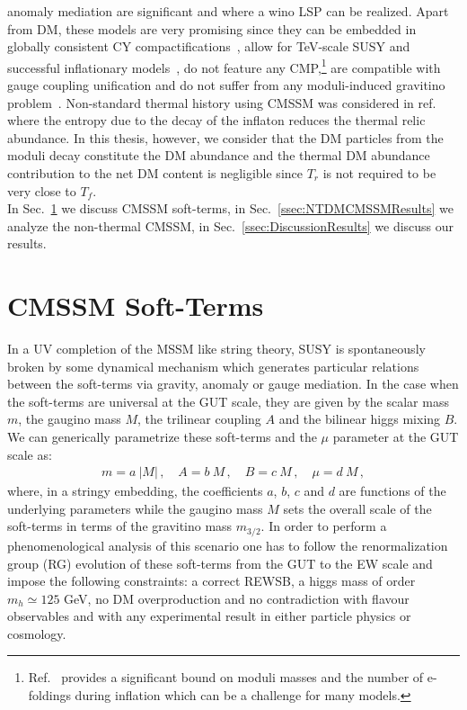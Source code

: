 \documentclass[12pt,a4paper]{book}
\begin{document}
anomaly mediation are significant and where a wino LSP can be realized. Apart from DM, these models are very promising since they can be embedded in globally consistent CY compactifications~\cite{Cicoli:2011qg, Cicoli:2012vw, Cicoli:2013cha}, allow for TeV-scale SUSY and successful inflationary models~\cite{Conlon:2005jm, Burgess:2013sla, Cicoli:2011zz}, do not feature any CMP,\footnote{Ref.~\cite{Dutta:2014tya} provides a significant bound on moduli masses and the number of e-foldings during inflation which can be a challenge for many models.} are compatible with gauge coupling unification and do not suffer from any moduli-induced gravitino problem~\cite{Endo:2006zj, Nakamura:2006uc}. Non-standard thermal history using CMSSM was considered  in ref.~\cite{Roszkowski:2014lga} where the entropy due to the decay of the inflaton reduces the thermal relic abundance. In this thesis, however, we consider that the DM particles from the moduli decay constitute the DM abundance and the thermal  DM abundance contribution to the net DM content is negligible since $T_r$ is not required to be very close to $T_f$.\\

In Sec.~\ref{ssec:CMSSMSoftTerms} we discuss CMSSM soft-terms, in Sec.~\ref{ssec:NTDMCMSSMResults} we analyze the non-thermal CMSSM, in Sec.~\ref{ssec:DiscussionResults} we discuss our results.

\section{CMSSM Soft-Terms}
\label{ssec:CMSSMSoftTerms}

In a UV completion of the MSSM like string theory, SUSY is spontaneously broken by some dynamical mechanism which generates particular relations between the soft-terms via gravity, anomaly or gauge mediation. In the case when the soft-terms are universal at the GUT scale, they are given by the scalar mass $m$, the gaugino mass $M$, the trilinear coupling $A$ and the bilinear higgs mixing $B$. We can generically parametrize these soft-terms and the $\mu$ parameter at the GUT scale as:
\begin{align}
m = a\ |M|\,,\quad A = b\ M\,,\quad B = c \ M\,, \quad \mu = d\ M\,,
\label{CMSSM}
\end{align}
where, in a stringy embedding, the coefficients $a$, $b$, $c$ and $d$ are functions of the underlying parameters while the gaugino mass $M$ sets the overall scale of the soft-terms in terms of the gravitino mass $m_{3/2}$. In order to perform a phenomenological analysis of this scenario one has to follow the renormalization group (RG) evolution of these soft-terms from the GUT to the EW scale and impose the following constraints: a correct REWSB, a higgs mass of order $m_h \simeq 125$ GeV, no DM overproduction and no contradiction with flavour observables and with any experimental result in either particle physics or cosmology.\\
\end{document}
